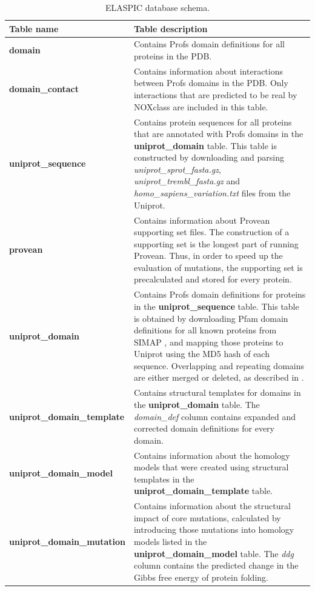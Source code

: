 \begin{table}[!tb]
\caption[ELASPIC database schema.]{ELASPIC database schema.} \label{tab:elaspic_database_schema}
\begin{tabular}{l | p{10cm}}
	\toprule
	Table name & Table description \\
	\midrule
	\textbf{domain} & Contains Profs domain definitions for all proteins in the PDB. \\
	\textbf{domain\_contact} & Contains information about interactions between Profs domains in the PDB. Only interactions that are predicted to be real by NOXclass \cite{zhu_noxclass:_2006} are included in this table. \\
	\textbf{uniprot\_sequence} & Contains protein sequences for all proteins that are annotated with Profs domains in the \textbf{uniprot\_domain} table. This table is constructed by downloading and parsing \textit{uniprot\_sprot\_fasta.gz}, \textit{uniprot\_trembl\_fasta.gz} and \textit{homo\_sapiens\_variation.txt} files from the Uniprot. \\
	\textbf{provean} & Contains information about Provean \cite{choi_predicting_2012} supporting set files. The construction of a supporting set is the longest part of running Provean. Thus, in order to speed up the evaluation of mutations, the supporting set is precalculated and stored for every protein. \\
	\textbf{uniprot\_domain} & Contains Profs domain definitions for proteins in the \textbf{uniprot\_sequence} table. This table is obtained by downloading Pfam domain definitions for all known proteins from SIMAP \cite{rattei_simapcomprehensive_2010}, and mapping those proteins to Uniprot using the MD5 hash of each sequence. Overlapping and repeating domains are either merged or deleted, as described in \cite{witvliet_elaspic_2016}. \\
	\textbf{uniprot\_domain\_template} & Contains structural templates for domains in the \textbf{uniprot\_domain} table. The \textit{domain\_def} column contains expanded and corrected domain definitions for every domain. \\
	\textbf{uniprot\_domain\_model} & Contains information about the homology models that were created using structural templates in the \textbf{uniprot\_domain\_template} table. \\
	\textbf{uniprot\_domain\_mutation} & Contains information about the structural impact of core mutations, calculated by introducing those mutations into homology models listed in the \textbf{uniprot\_domain\_model} table. The \textit{ddg} column contains the predicted change in the Gibbs free energy of protein folding. \\

\end{tabular}
\end{table}
